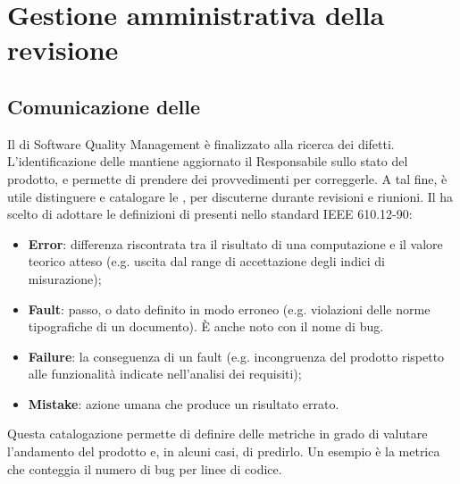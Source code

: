 \section{Gestione amministrativa della revisione}
\subsection{Comunicazione delle }
Il  di Software Quality Management è finalizzato alla ricerca dei difetti. L'identificazione delle  mantiene aggiornato il Responsabile sullo stato del prodotto, e permette di prendere dei provvedimenti per correggerle. A tal fine, è utile distinguere e catalogare le , per discuterne durante revisioni e riunioni. Il  ha scelto di adottare le definizioni di  presenti nello standard IEEE 610.12-90:
\begin{itemize}
\item \textbf{Error}: differenza riscontrata tra il risultato di una computazione e il valore teorico atteso (e.g. uscita dal range di accettazione degli indici di misurazione);
\item \textbf{Fault}: passo,  o dato definito in modo erroneo (e.g. violazioni delle norme tipografiche di un documento). \`E anche noto con il nome di bug.
\item \textbf{Failure}: la conseguenza di un fault (e.g. incongruenza del prodotto rispetto alle funzionalità indicate nell'analisi dei requisiti);
\item \textbf{Mistake}: azione umana che produce un risultato errato.
\end{itemize}
Questa catalogazione permette di definire delle metriche in grado di valutare l'andamento del prodotto e, in alcuni casi, di predirlo. Un esempio è la metrica che conteggia il numero di bug per linee di codice.

